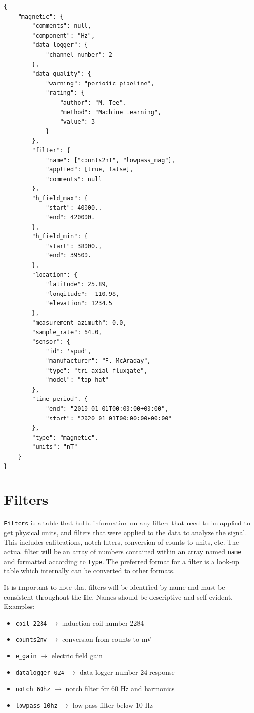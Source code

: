 \documentclass[12pt]{article}
\begin{document}
\begin{verbatim}
{
    "magnetic": {
        "comments": null,
        "component": "Hz",
        "data_logger": {
            "channel_number": 2
        },
        "data_quality": {
            "warning": "periodic pipeline",
            "rating": {
                "author": "M. Tee",
                "method": "Machine Learning",
                "value": 3
            }
        },
        "filter": {
            "name": ["counts2nT", "lowpass_mag"],
            "applied": [true, false],
            "comments": null
        },
        "h_field_max": {
            "start": 40000.,
            "end": 420000.
        },
        "h_field_min": {
            "start": 38000.,
            "end": 39500.
        },
        "location": {
            "latitude": 25.89,
            "longitude": -110.98,
            "elevation": 1234.5
        },
        "measurement_azimuth": 0.0,
        "sample_rate": 64.0,
        "sensor": {
            "id": 'spud',
            "manufacturer": "F. McAraday",
            "type": "tri-axial fluxgate",
            "model": "top hat"
        },
        "time_period": {
            "end": "2010-01-01T00:00:00+00:00",
            "start": "2020-01-01T00:00:00+00:00"
        },
        "type": "magnetic",
        "units": "nT"
    }
}
\end{verbatim}

\newpage
\section{Filters}

\verb|Filters| is a table that holds information on any filters that need to be applied to get physical units, and filters that were applied to the data to analyze the signal.  This includes calibrations, notch filters, conversion of counts to units, etc. The actual filter will be an array of numbers contained within an array named \verb|name| and formatted according to \verb|type|. The preferred format for a filter is a look-up table which internally can be converted to other formats. 

It is important to note that filters will be identified by name and must be consistent throughout the file. Names should be descriptive and self evident. Examples:
\begin{itemize}
    \item \verb|coil_2284| $\longrightarrow$ induction coil number 2284
    \item \verb|counts2mv| $\longrightarrow$ conversion from counts to mV
    \item \verb|e_gain| $\longrightarrow$ electric field gain 
    \item \verb|datalogger_024| $\longrightarrow$ data logger number 24 response
    \item \verb|notch_60hz| $\longrightarrow$ notch filter for 60 Hz and harmonics
    \item \verb|lowpass_10hz| $\longrightarrow$ low pass filter below 10 Hz
\end{itemize}
\end{document}

